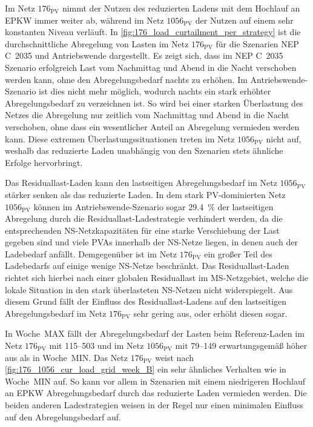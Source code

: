

Im Netz \(176_{\text{PV}}\) nimmt der Nutzen des reduzierten Ladens mit dem Hochlauf an \gls{EPKW} immer weiter ab, während im Netz \(1056_{\text{PV}}\) der Nutzen auf einem sehr konstanten Niveau verläuft.
In \autoref{fig:176_load_curtailment_per_strategy} ist die durchschnittliche Abregelung von Lasten im Netz \(176_{\text{PV}}\) für die Szenarien \gls{NEP} C~\num{2035} und Antriebswende dargestellt.
Es zeigt sich, dass im \gls{NEP} C~\num{2035} Szenario erfolgreich Last vom Nachmittag und Abend in die Nacht verschoben werden kann, ohne den Abregelungsbedarf nachts zu erhöhen.
Im Antriebswende-Szenario ist dies nicht mehr möglich, wodurch nachts ein stark erhöhter Abregelungsbedarf zu verzeichnen ist.
So wird bei einer starken Überlastung des Netzes die Abregelung nur zeitlich vom Nachmittag und Abend in die Nacht verschoben, ohne dass ein wesentlicher Anteil an Abregelung vermieden werden kann.
Diese extremen Überlastungssituationen treten im Netz \(1056_{\text{PV}}\) nicht auf, weshalb das reduzierte Laden unabhängig von den Szenarien stets ähnliche Erfolge hervorbringt.



Das Residuallast-Laden kann den lastseitigen Abregelungsbedarf im Netz \(1056_{\text{PV}}\) stärker senken als das reduzierte Laden.
In dem stark \gls{PV}-dominierten Netz \(1056_{\text{PV}}\) können im Antriebswende-Szenario sogar \SI{29.4}{\percent} der lastseitigen Abregelung durch die Residuallast-Ladestrategie verhindert werden, da die entsprechenden \gls{NS}-Netzkapazitäten für eine starke Verschiebung der Last gegeben sind und viele \glspl{PVA} innerhalb der \gls{NS}-Netze liegen, in denen auch der Ladebedarf anfällt.
Demgegenüber ist im Netz \(176_{\text{PV}}\) ein großer Teil des Ladebedarfs auf einige wenige \gls{NS}-Netze beschränkt.
Das Residuallast-Laden richtet sich hierbei nach einer globalen Residuallast im \gls{MS}-Netzgebiet, welche die lokale Situation in den stark überlasteten \gls{NS}-Netzen nicht widerspiegelt.
Aus diesem Grund fällt der Einfluss des Residuallast-Ladens auf den lastseitigen Abregelungsbedarf im Netz \(176_{\text{PV}}\) sehr gering aus, oder erhöht diesen sogar.\medskip

In Woche~MAX fällt der Abregelungsbedarf der Lasten beim Referenz-Laden im Netz \(176_{\text{PV}}\) mit \SIrange{115}{503}{\mwh} und im Netz \(1056_{\text{PV}}\) mit \SIrange{79}{149}{\mwh} erwartungsgemäß höher aus als in Woche~MIN.
Das Netz \(176_{\text{PV}}\) weist nach \autoref{fig:176_1056_cur_load_grid_week_B} ein sehr ähnliches Verhalten wie in Woche~MIN auf.
So kann vor allem in Szenarien mit einem niedrigeren Hochlauf an \gls{EPKW} Abregelungsbedarf durch das reduzierte Laden vermieden werden.
Die beiden anderen Ladestrategien weisen in der Regel nur einen minimalen Einfluss auf den Abregelungsbedarf auf.\medskip


